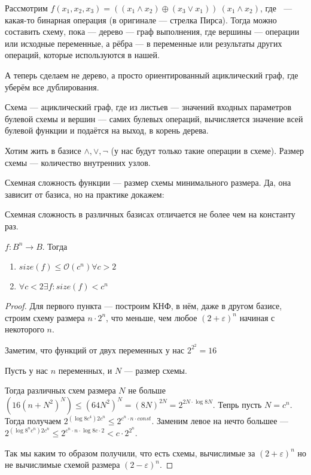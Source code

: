 Рассмотрим $f(x_1, x_2, x_3) = ((x_1 \land x_2) \oplus (x_3 \lor x_1)) ~ (x_1 \land x_2)$, где $~$ --- какая-то бинарная операция (в оригинале --- стрелка Пирса). Тогда можно составить схему, пока --- дерево  --- граф выполнения, где вершины --- операции или исходные переменные, а рёбра --- в переменные или результаты других операций, которые используются в нашей. 

А теперь сделаем не дерево, а просто ориентированный ациклический граф, где уберём все дублирования. 

\begin{definition}
	Схема --- ациклический граф, где из листьев --- значений входных параметров булевой схемы и вершин --- самих булевых операций, вычисляется значение всей булевой функции и подаётся на выход, в корень дерева. 
\end{definition}

Хотим жить в базисе $\land, \lor, \lnot$ (у нас будут только такие операции в схеме). Размер схемы --- количество внутренних узлов. 

\begin{definition}
	Схемная сложность функции --- размер схемы минимального размера. Да, она зависит от базиса, но на практике докажем:
\end{definition}

\begin{theorem}
	Схемная сложность в различных базисах отличается не более чем на константу раз.
\end{theorem}

\begin{theorem}
	$f: B^n \to B$. Тогда

	\begin{enumerate}
		\item{$size(f) \le \mathcal{O}(c^n) \forall c > 2$}
		\item{$\forall c < 2 \exists f : size(f) < c^n$}
	\end{enumerate}
\end{theorem}
\begin{proof}
	Для первого пункта --- построим КНФ, в нём, даже в другом базисе, строим схему размера $n \cdot 2^n$, что меньше, чем любое $(2 + \varepsilon)^n$ начиная с некоторого $n$. 
	
	Заметим, что функций от двух переменных у нас $2^{2^2} = 16$

	Пусть у нас $n$ переменных, и $N$ --- размер схемы.

	Тогда различных схем размера $N$ не больше $(16(n + N^2)^N) \le (64N^2)^N = (8N)^{2N} = 2^{2N \cdot \log 8N}$. Тепрь пусть $N = c^n$. Тогда получаем $2^{(\log 8c^4) 2c^n} \le 2^{c^n \cdot n \cdot const}$. Заменим левое на нечто большее --- $2^{(\log 8^n c^n) 2 c^n} \le 2^{c^n \cdot n \cdot \log 8c \cdot 2} < c\cdot 2^{2^n}$.

	Так мы каким то образом получили, что есть схемы, вычислимые за $(2+\varepsilon)^n$ но не вычислимые схемой размера $(2-\varepsilon)^n$.
\end{proof}

